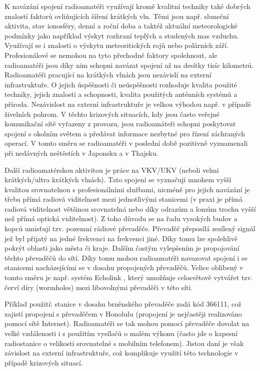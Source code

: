 K navázání spojení radioamatéři využívají kromě
kvalitní techniky také dobrých znalostí faktorů
ovliňujících šíření krátkých vln. Těmi jsou např. sluneční aktivita,
stav ionosféry, denní a roční doba a taktéž aktuální meteorologické podmínky
jako například výskyt
rozhraní teplých a studených mas vzduchu. Využívají se i znalosti o výskytu
meteoritických rojů nebo polárních září. Profesionálové se nemohou na tyto přechodné faktory spolehnout, ale 
radioamatéři jsou díky nim schopni navázat spojení až na desítky tisíc
kilometrů. Radioamatéři pracující na krátkých vlnách jsou nezávislí na externí
infrastruktuře. O jejich úspěšnosti či neúspěšnosti rozhoduje kvalita použité techniky,
jejich znalosti a schopnosti, kvalita použitých anténních systémů a příroda. Nezávislost na externí infrastruktuře je velkou výhodou např. v
případě živelních pohrom. V těchto krizových situacích, kdy jsou často veřejné
komunikační sítě vyřazeny z provozu, jsou radioamáteři schopni poskytovat
spojení s okolním světem a předávat informace nezbytné pro řízení záchraných
operací. V tomto směru se radioamatéři v poslední době pozitivně vyznamenali při
nedávných neštěstích v Japonsku a v Thajsku. 

Další radioamatérskou aktivitou je práce na VKV/UKV (neboli velmi krátkých/ultra
krátkých vlnách). Tato spojení se vyznačují mnohem vyšší kvalitou srovnatelnou s
profesionálními službami, nicméně pro jejich navázání je třeba přímá radiová
viditelnost mezi jednotlivými stanicemi (v praxi je přímá radiová viditelnost
většinou srovnatelná nebo díky odrazům a lomům trochu vyšší než přímá optická
viditelnost).
Z toho důvodu se na řadu vysokých budov a kopců umisťují tzv. pozemní rádiové
převaděče. Převaděč přeposílá zesílený signál jež byl přijatý na jedné frekvenci
na frekvenci jiné. Díky tomu lze spolehlivě pokrýt oblasti jako města či kraje.
Dalším častým vylepšením je propojování těchto převaděčů do sítí. Díky tomu mohou
radioamatéři navazovat spojení i se stanicemi nacházejícími se v dosahu
propojených převaděčů. Velice oblíbený v tomto směru je např. systém
Echolink \cite{echolink}, %
který umožňuje celosvětově vytvářet tzv. červí díry (wormholes) mezi libovolnými
převaděči v této síti.

Příklad použití: stanice v dosahu brněnského převaděče
zadá kód 366111, což zajistí propojení s převaděčem v Honolulu (propojení je
nejčastěji realizováno pomocí sítě Internet). Radioamatéři se tak mohou pomocí převaděče dovolat na velké vzdálenosti i s použitím vysílačů o malém výkonu
(často jde o kapesní radiostanice o velikosti srovnatelné s mobilním telefonem).
Jistou daní je však závislost na externí infrastruktuře, což komplikuje využití
této technologie v případě krizových situací.


